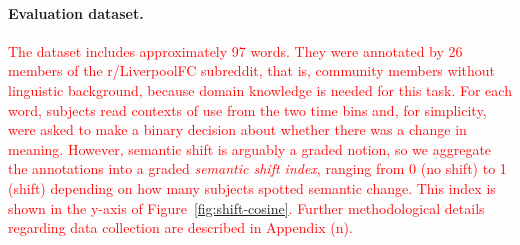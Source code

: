 \paragraph{Evaluation dataset.} 
\textcolor{red}{
  The dataset includes approximately 97 words.
They were annotated by 26 members of the r/LiverpoolFC
subreddit, that is, community members without linguistic background,
because domain knowledge is needed for this task.  For each word, subjects
read contexts of use from the two time bins and, for simplicity, were
asked to make a binary decision
about whether there was a change in meaning. However, semantic shift
is arguably a graded notion, so we aggregate the annotations into a
graded \emph{semantic shift index}, ranging from 0
(no shift) to 1 (shift) depending on how many subjects spotted
semantic change. This index is shown in the y-axis of
Figure~\ref{fig:shift-cosine}. Further methodological details regarding data
collection are described in Appendix (n). }



